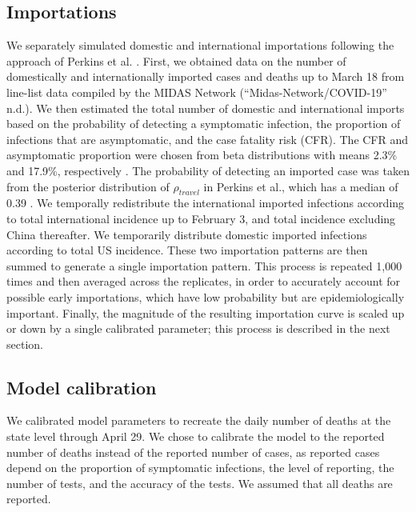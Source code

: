 \documentclass[11pt]{article}
\begin{document}
\subsection{Importations}
We separately simulated domestic and international importations following the approach of Perkins et al. \cite{Perkins2020_MedRxiv}. First, we obtained data on the number of domestically and internationally imported cases and deaths up to March 18 from line-list data compiled by the MIDAS Network (“Midas-Network/COVID-19” n.d.). We then estimated the total number of domestic and international imports based on the probability of detecting a symptomatic infection, the proportion of infections that are asymptomatic, and the case fatality risk (CFR). The CFR and asymptomatic proportion were chosen from beta distributions with means 2.3\% and 17.9\%, respectively \cite{ChinaCDC2020_weekly,Mizumoto2020_Eurosurveillance}. The probability of detecting an imported case was taken from the posterior distribution of $\rho_{travel}$ in Perkins et al., which has a median of 0.39 \cite{Perkins2020_MedRxiv}. We temporally redistribute the international imported infections according to total international incidence up to February 3, and total incidence excluding China thereafter. We temporarily distribute domestic imported infections according to total US incidence. These two importation patterns are then summed to generate a single importation pattern. This process is repeated 1,000 times and then averaged across the replicates, in order to accurately account for possible early importations, which have low probability but are epidemiologically important. Finally, the magnitude of the resulting importation curve is scaled up or down by a single calibrated parameter; this process is described in the next section.

\subsection{Model calibration}
We calibrated model parameters to recreate the daily number of deaths at the state level through April 29. We chose to calibrate the model to the reported number of deaths instead of the reported number of cases, as reported cases depend on the proportion of symptomatic infections, the level of reporting, the number of tests, and the accuracy of the tests. We assumed that all deaths are reported.
\end{document}
